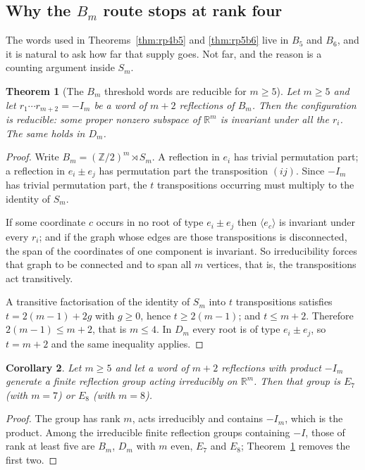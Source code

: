 \documentclass[11pt,a4paper]{article}
\theoremstyle{plain}
\newtheorem{theorem}{Theorem}[section]
\newtheorem{corollary}[theorem]{Corollary}
\theoremstyle{definition}
\theoremstyle{remark}
\begin{document}
\subsection{Why the $B_m$ route stops at rank four}

The words used in Theorems~\ref{thm:rp4b5} and \ref{thm:rp5b6} live in $B_5$ and
$B_6$, and it is natural to ask how far that supply goes. Not far, and the reason is
a counting argument inside $S_m$.

\begin{theorem}[The $B_m$ threshold words are reducible for $m\ge5$]\label{thm:bmstops}
Let $m\ge5$ and let $r_1\cdots r_{m+2}=-I_m$ be a word of $m+2$ reflections of
$B_m$. Then the configuration is reducible: some proper nonzero subspace of
$\mathbb{R}^m$ is invariant under all the $r_i$. The same holds in $D_m$.
\end{theorem}

\begin{proof}
Write $B_m=(\mathbb{Z}/2)^m\rtimes S_m$. A reflection in $e_i$ has trivial
permutation part; a reflection in $e_i\pm e_j$ has permutation part the transposition
$(ij)$. Since $-I_m$ has trivial permutation part, the $t$ transpositions occurring
must multiply to the identity of $S_m$.

If some coordinate $c$ occurs in no root of type $e_i\pm e_j$ then $\langle
e_c\rangle$ is invariant under every $r_i$; and if the graph whose edges are those
transpositions is disconnected, the span of the coordinates of one component is
invariant. So irreducibility forces that graph to be connected and to span all $m$
vertices, that is, the transpositions act transitively.

A transitive factorisation of the identity of $S_m$ into $t$ transpositions satisfies
$t=2(m-1)+2g$ with $g\ge0$, hence $t\ge2(m-1)$; and $t\le m+2$. Therefore
$2(m-1)\le m+2$, that is $m\le4$. In $D_m$ every root is of type $e_i\pm e_j$, so
$t=m+2$ and the same inequality applies.
\end{proof}

\begin{corollary}\label{cor:onlyE7E8}
Let $m\ge5$ and let a word of $m+2$ reflections with product $-I_m$ generate a
finite reflection group acting irreducibly on $\mathbb{R}^m$. Then that group is $E_7$
(with $m=7$) or $E_8$ (with $m=8$).
\end{corollary}

\begin{proof}
The group has rank $m$, acts irreducibly and contains $-I_m$, which is the product.
Among the irreducible finite reflection groups containing $-I$, those of rank at
least five are $B_m$, $D_m$ with $m$ even, $E_7$ and $E_8$;
Theorem~\ref{thm:bmstops} removes the first two.
\end{proof}
\end{document}
